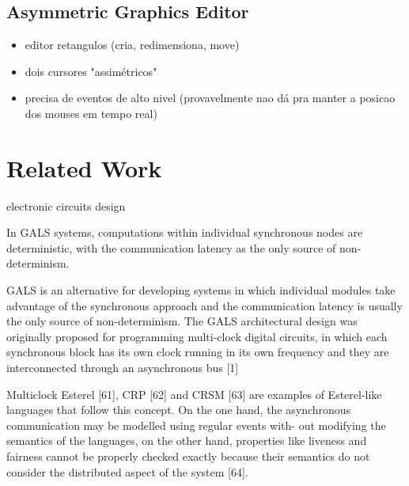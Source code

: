 \documentclass[sigplan,screen]{acmart}
\begin{document}
\subsection{Asymmetric Graphics Editor}

\begin{itemize}
\item editor retangulos (cria, redimensiona, move)
\item dois cursores "assimétricos"
\item precisa de eventos de alto nivel (provavelmente nao dá pra manter a posicao dos mouses em tempo real)
\end{itemize}

\section{Related Work}
\label{sec.related}

electronic circuits design

\cite{gals.taxonomy}

In GALS
systems, computations within individual synchronous nodes are deterministic,
with the communication latency as the only source of non-determinism.

GALS is an alternative for developing systems in which individual
modules take advantage of the synchronous approach and the communication
latency is usually the only source of non-determinism. The GALS architectural
design was originally proposed for programming multi-clock digital circuits, in
which each synchronous block has its own clock running in its own frequency
and they are interconnected through an asynchronous bus [1]

Multiclock Esterel [61], CRP [62] and CRSM [63] are
examples of Esterel-like languages that follow this concept. On the one hand,
the asynchronous communication may be modelled using regular events with-
out modifying the semantics of the languages, on the other hand, properties
like liveness and fairness cannot be properly checked exactly because their
semantics do not consider the distributed aspect of the system [64].
\end{document}
